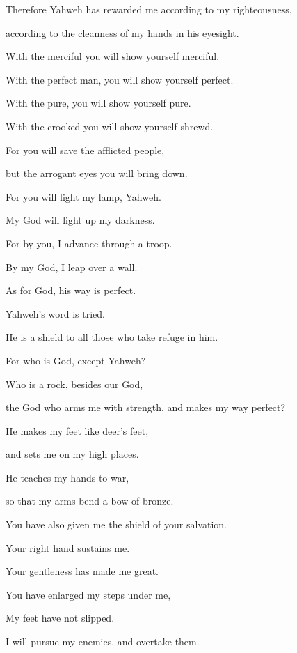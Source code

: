 {\par }{\Q {}Therefore Yahweh has rewarded me according to my righteousness,
\par }{\QB according to the cleanness of my hands in his eyesight.
\par }{\Q {}With the merciful you will show yourself merciful.
\par }{\QB With the perfect man, you will show yourself perfect.
\par }{\Q {}With the pure, you will show yourself pure.
\par }{\QB With the crooked you will show yourself shrewd.
\par }{\Q {}For you will save the afflicted people,
\par }{\QB but the arrogant eyes you will bring down.
\par }{\Q {}For you will light my lamp, Yahweh.
\par }{\QB My God will light up my darkness.
\par }{\Q {}For by you, I advance through a troop.
\par }{\QB By my God, I leap over a wall.
\par }{\Q {}As for God, his way is perfect.
\par }{\QB Yahweh’s word is tried.
\par }{\QB He is a shield to all those who take refuge in him.
\par }{\Q {}For who is God, except Yahweh?
\par }{\QB Who is a rock, besides our God,
\par }{\QB {}the God who arms me with strength, and makes my way perfect?
\par }{\Q {}He makes my feet like deer’s feet,
\par }{\QB and sets me on my high places.
\par }{\Q {}He teaches my hands to war,
\par }{\QB so that my arms bend a bow of bronze.
\par }{\Q {}You have also given me the shield of your salvation.
\par }{\QB Your right hand sustains me.
\par }{\QB Your gentleness has made me great.
\par }{\Q {}You have enlarged my steps under me,
\par }{\QB My feet have not slipped.
\par }{\Q {}I will pursue my enemies, and overtake them.
}
